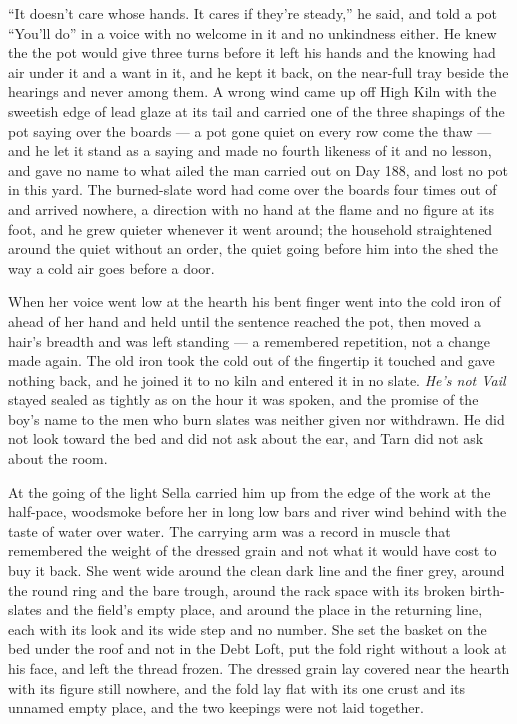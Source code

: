 “It doesn't care whose hands. It cares if they're steady,” he said, and told a pot “You'll do” in a voice with no welcome in it and no unkindness either. He knew the  the pot would give three turns before it left his hands and the knowing had air under it and a want in it, and he kept it back, on the near-full tray beside the hearings and never among them. A wrong wind came up off High Kiln with the sweetish edge of lead glaze at its tail and carried one of the three shapings of the pot saying over the boards --- a pot gone quiet on every row come the thaw --- and he let it stand as a saying and made no fourth likeness of it and no lesson, and gave no name to what ailed the man carried out on Day 188, and lost no pot in this yard. The burned-slate word had come over the boards four times out of  and arrived nowhere, a direction with no hand at the flame and no figure at its foot, and he grew quieter whenever it went around; the household straightened around the quiet without an order, the quiet going before him into the shed the way a cold air goes before a door.

When her voice went low at the hearth his bent finger went into the cold iron of  ahead of her hand and held until the sentence reached the pot, then moved a hair's breadth and was left standing --- a remembered repetition, not a change made again. The old iron took the cold out of the fingertip it touched and gave nothing back, and he joined it to no kiln and entered it in no slate. \emph{He's not Vail} stayed sealed as tightly as on the hour it was spoken, and the promise of the boy's name to the men who burn slates was neither given nor withdrawn. He did not look toward the bed and did not ask about the ear, and Tarn did not ask about the room.

\scenebreak

At the going of the light Sella carried him up from the edge of the work at the half-pace, woodsmoke before her in long low bars and river wind behind with the taste of water over water. The carrying arm was a record in muscle that remembered the weight of the dressed grain and not what it would have cost to buy it back. She went wide around the clean dark line and the finer grey, around the round ring and the bare trough, around the rack space with its broken birth-slates and the field's empty place, and around the place in the returning line, each with its look and its wide step and no number. She set the basket on the bed under the roof and not in the Debt Loft, put the fold right without a look at his face, and left the thread frozen. The dressed grain lay covered near the hearth with its figure still nowhere, and the fold lay flat with its one crust and its unnamed empty place, and the two keepings were not laid together.

